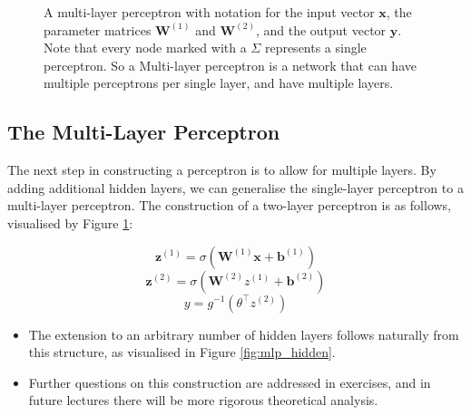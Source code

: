 \begin{figure}[h!]
    \caption{A multi-layer perceptron with notation for the input vector $\bm{x}$, the parameter matrices $\bm{W}^{(1)}$ and $\bm{W}^{(2)}$, and the output vector $\bm{y}$. Note that every node marked with a $\Sigma$ represents a single perceptron. So a Multi-layer perceptron is a network that can have multiple perceptrons per single layer, and have multiple layers.}
    \label{fig:mlp}
\end{figure}

\subsection{The Multi-Layer Perceptron}

The next step in constructing a perceptron is to allow for multiple layers. By adding additional hidden layers, we can generalise the single-layer perceptron to a multi-layer perceptron. The construction of a two-layer perceptron is as follows, visualised by Figure \ref{fig:mlp}:

\[
    \bm{z}^{(1)} = \sigma (\bm{W}^{(1)} \bm{x} + \bm{b}^{(1)})
\]
\[
    \bm{z}^{(2)} = \sigma (\bm{W}^{(2)} z^{(1)} + \bm{b}^{(2)})
\]
\[
    y = g^{-1} \left( \theta^\top z^{(2)} \right)
\]


\begin{itemize}
    \item The extension to an arbitrary number of hidden layers follows naturally from this structure, as visualised in Figure \ref{fig:mlp_hidden}.
    \item Further questions on this construction are addressed in exercises, and in future lectures there will be more rigorous theoretical analysis.
\end{itemize}


